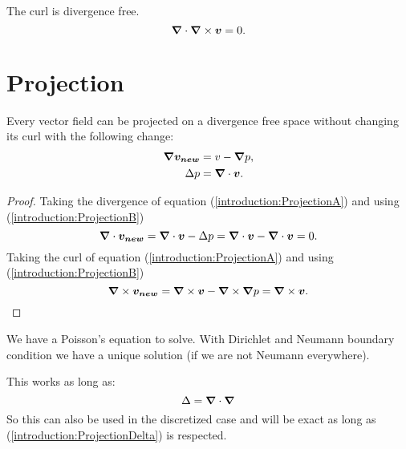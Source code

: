 \begin{property}
The curl is divergence free.
 \begin{equation}
  {\boldsymbol {\nabla}}\cdot {\boldsymbol {\nabla}} \times {\boldsymbol {v}}=0.
 \end{equation}
\end{property}

\section{Projection}
\label{introduction:projection}
\begin{property}
 Every vector field can be projected on a divergence free space without changing its curl with the following change:
\begin{align}
 {\boldsymbol {\nabla}}{\boldsymbol {v_{new}}}&=v-{\boldsymbol {\nabla}}p \label{introduction:ProjectionA},\\
 \Delta p&={\boldsymbol {\nabla}} \cdot {\boldsymbol {v}} \label{introduction:ProjectionB}.
\end{align}
\end{property}
\begin{proof}
  Taking the divergence of equation (\ref{introduction:ProjectionA}) and using (\ref{introduction:ProjectionB})
  \begin{equation}
   {\boldsymbol {\nabla}}\cdot{\boldsymbol {v_{new}}}={\boldsymbol {\nabla}}\cdot{\boldsymbol {v}}-\Delta p={\boldsymbol {\nabla}}\cdot{\boldsymbol {v}}-{\boldsymbol {\nabla}}\cdot{\boldsymbol {v}}=0.
  \end{equation}
  Taking the curl of equation (\ref{introduction:ProjectionA}) and using (\ref{introduction:ProjectionB})
  \begin{equation}
   {\boldsymbol {\nabla}}\times{\boldsymbol {v_{new}}}={\boldsymbol {\nabla}}\times{\boldsymbol {v}}-{\boldsymbol {\nabla}}\times{\boldsymbol {\nabla}} p={\boldsymbol {\nabla}}\times{\boldsymbol {v}}.
  \end{equation}
  \end{proof}
  
   \begin{remark}
    We have a Poisson's equation to solve. With Dirichlet and Neumann boundary condition we have a unique solution (if we are not
    Neumann everywhere).	
   \end{remark}

  
  \begin{remark}
 This works as long as:
 \begin{equation}
  \Delta={\boldsymbol {\nabla}}\cdot {\boldsymbol {\nabla}}\label{introduction:ProjectionDelta}
 \end{equation}
 So this can also be used in the discretized case and will be exact as long as (\ref{introduction:ProjectionDelta}) is respected.
 \end{remark}


